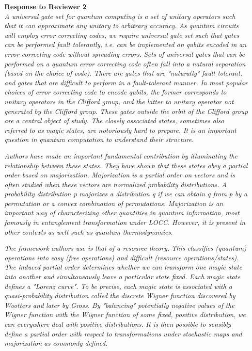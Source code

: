 \documentclass[11pt]{letter}
\begin{document}
\textbf{\large{Response to Reviewer 2}}\\

\textit{A universal gate set for quantum computing is a set of unitary operators such that it can approximate any unitary to arbitrary accuracy. As quantum circuits will employ error correcting codes, we require universal gate set such that gates can be performed fault tolerantly, i.e. can be implemented on qubits encoded in an error correcting code without spreading errors. Sets of universal gates that can be performed on a quantum error correcting code often fall into a natural separation (based on the choice of code). There are gates that are "naturally" fault tolerant, and gates that are difficult to perform in a fault-tolerant manner. In most popular choices of error correcting code to encode qubits, the former corresponds to unitary operators in the Clifford group, and the latter to unitary operator not generated by the Clifford group. These gates outside the orbit of the Clifford group are a central object of study. The closely associated states, sometimes also referred to as magic
states, are notoriously hard to prepare. It is an important question in quantum computation to understand their structure.}

\textit{Authors have made an important fundamental contribution by illuminating the relationship between these states. They have shown that these states obey a partial order based on majorization. Majorization is a partial order on vectors and is often studied when these vectors are normalized probability distributions. A probability distribution p majorizes a distribution q if we can obtain q from p by a permutation or a convex combination of permutations. Majorization is an important way of characterizing other quantities in quantum information, most famously in entanglement transformation under LOCC. However, it is present in other contexts as well such as quantum thermodynamics.}

\textit{The framework authors use is that of a resource theory. This classifies (quantum) operations into easy (free operations) and difficult (resource operations/states). The induced partial order determines whether we can transform one magic state into another and simultaneously leave a particular state fixed. Each magic state defines a "Lorenz curve". To be precise, each magic state is associated with a quasi-probability distribution called the discrete Wigner function discovered by Wootters and later by Gross. By "balancing" potentially negative values of the Wigner function with the Wigner function of some fixed, positive distribution, we can everywhere deal with positive distributions. It is then possible to sensibly define a partial order with respect to transformations under stochastic maps and majorization as commonly defined.}
\end{document}
